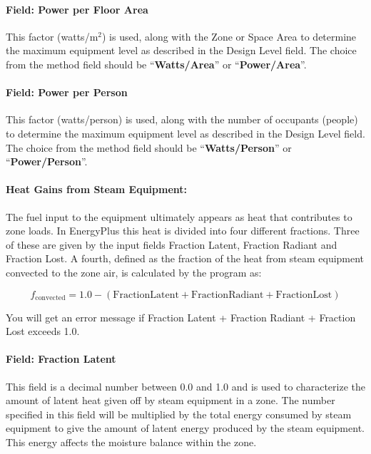 \paragraph{Field: Power per Floor Area}\label{field-power-per-zone-floor-area-2-steam-definition}

This factor (watts/m\(^{2}\)) is used, along with the Zone or Space Area to determine the maximum equipment level as described in the Design Level field. The choice from the method field should be ``\textbf{Watts/Area}'' or ``\textbf{Power/Area}''.

\paragraph{Field: Power per Person}\label{field-power-per-person-2-steam-definition}

This factor (watts/person) is used, along with the number of occupants (people) to determine the maximum equipment level as described in the Design Level field. The choice from the method field should be ``\textbf{Watts/Person}'' or ``\textbf{Power/Person}''.

\paragraph{Heat Gains from Steam Equipment:}\label{heat-gains-from-steam-equipment-steam-definition}

The fuel input to the equipment ultimately appears as heat that contributes to zone loads. In EnergyPlus this heat is divided into four different fractions. Three of these are given by the input fields Fraction Latent, Fraction Radiant and Fraction Lost. A fourth, defined as the fraction of the heat from steam equipment convected to the zone air, is calculated by the program as:

\begin{equation}
  f_{\mathrm{convected}} = 1.0 - (\mathrm{Fraction Latent} + \mathrm{Fraction Radiant} + \mathrm{Fraction Lost})
\end{equation}

You will get an error message if Fraction Latent + Fraction Radiant + Fraction Lost exceeds 1.0.

\paragraph{Field: Fraction Latent}\label{field-fraction-latent-3-steam-definition}

This field is a decimal number between 0.0 and 1.0 and is used to characterize the amount of latent heat given off by steam equipment in a zone. The number specified in this field will be multiplied by the total energy consumed by steam equipment to give the amount of latent energy produced by the steam equipment. This energy affects the moisture balance within the zone.

